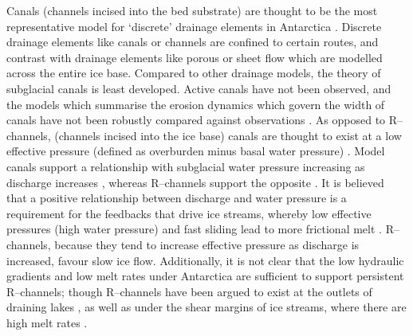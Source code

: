 Canals (channels incised into the bed substrate) are thought to be the most representative model for `discrete' drainage elements in Antarctica \citep[e.g.][]{walder1994channelized,simkins2017anatomy}. Discrete drainage elements like canals or channels are confined to certain routes, and contrast with drainage elements like porous or sheet flow which are modelled across the entire ice base. Compared to other drainage models, the theory of subglacial canals is least developed. Active canals have not been observed, and the models which summarise the erosion dynamics which govern the width of canals have not been robustly compared against observations \citep[e.g.][]{damsgaard2017sediment}. As opposed to R--channels, (channels incised into the ice base) canals are thought to exist at a low effective pressure (defined as overburden
minus basal water pressure) \citep{walder1994channelized}. Model canals support a relationship with subglacial water pressure increasing as discharge increases \citep{walder1994channelized,ng1998mathematical}, whereas R--channels support the opposite  \citep{rothlisberger1972water,shreve1972movement}. 
It is believed that a positive relationship between discharge and water pressure is a requirement for the feedbacks that drive ice streams, whereby low effective pressures (high water pressure) and fast sliding lead to more frictional melt \citep{fowler1996ice}.
R--channels, because they tend to 
increase effective pressure as discharge is increased, favour slow ice flow. 
Additionally, it is not clear that the low hydraulic gradients and low melt rates under Antarctica are sufficient to support persistent R--channels; though R--channels have been argued to exist at the outlets of draining lakes \citep{evatt2006subglacial,pattyn2008investigating}, as well as under the shear margins of ice streams, where there are high melt rates \citep{perol2011control}. 

